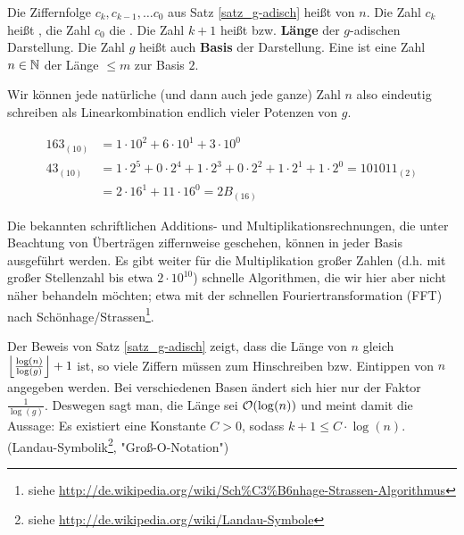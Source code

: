 \begin{defn}
	Die Ziffernfolge $c_k, c_{k-1}, \dots c_0$ aus Satz \ref{satz_g-adisch} heißt  von $n$. Die Zahl $c_k$ heißt , die Zahl $c_0$ die . Die Zahl $k+1$ heißt  bzw. \textbf{Länge} der $g$-adischen Darstellung. Die Zahl $g$ heißt auch \textbf{Basis} der Darstellung. Eine  ist eine Zahl $n \in \NN$ der Länge $\leq m$ zur Basis $2$.  
\end{defn}

\begin{bem}
	Wir können jede natürliche (und dann auch jede ganze) Zahl $n$ also eindeutig schreiben als Linearkombination endlich vieler Potenzen von $g$.
\end{bem}

\begin{bsp}
 \begin{equation}
 \begin{aligned}
	 163_{(10)} &= 1 \cdot 10^2 + 6 \cdot 10^1 + 3 \cdot 10^0 \\
	 43_{(10)}	&= 1 \cdot 2^5 + 0 \cdot 2^4 + 1 \cdot 2^3 + 0 \cdot 2^2 + 1 \cdot 2^1 + 1 \cdot 2^0 = 101011_{(2)} \\
	 &= 2 \cdot 16^1 + 11 \cdot 16^0 = 2B_{(16)}
 \end{aligned}
 \end{equation}
\end{bsp}

Die bekannten schriftlichen Additions- und Multiplikationsrechnungen, die unter Beachtung von Überträgen ziffernweise geschehen, können in jeder Basis ausgeführt werden. Es gibt weiter für die Multiplikation großer Zahlen (d.h. mit großer Stellenzahl bis etwa $2 \cdot 10^{10}$) schnelle Algorithmen, die wir hier aber nicht näher behandeln möchten; etwa mit der schnellen Fouriertransformation (FFT) nach Schönhage/Strassen\footnote{siehe \url{http://de.wikipedia.org/wiki/Sch\%C3\%B6nhage-Strassen-Algorithmus}}.

Der Beweis von Satz \ref{satz_g-adisch} zeigt, dass die Länge von $n$ gleich $\floor*{\frac{\log(n)}{\log(g)}}+1$ ist, so viele Ziffern müssen zum Hinschreiben bzw. Eintippen von $n$ angegeben werden. Bei verschiedenen Basen ändert sich hier nur der Faktor $\frac{1}{\log(g)}$. Deswegen sagt man, die Länge sei $\oh(\log(n))$ und meint damit die Aussage: Es existiert eine Konstante $C > 0$, sodass $k + 1 \leq C \cdot \log(n)$. (Landau-Symbolik\footnote{siehe \url{http://de.wikipedia.org/wiki/Landau-Symbole}}, "Groß-O-Notation")

